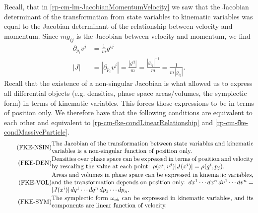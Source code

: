 Recall, that in \ref{rp-cm-lm-JacobianMomentumVelocity} we saw that the Jacobian determinant of the transformation from state variables to kinematic variables was equal to the Jacobian determinant of the relationship between velocity and momentum. Since $m g_{ij}$ is the Jacobian between velocity and momentum, we find
\begin{equation}\label{rp-cm-fke-metricTensorDeterminantIsJacobianForDensities}
	\begin{aligned}
		\partial_{p_i} v^j &= \frac{1}{m}g^{ij} \\
		|J| &= |\partial_{p_i} v^j | = \frac{|g^{ij}|}{m} = \frac{|g_{ij}|^{-1}}{m} = \frac{1}{m \,|g_{ij}|}. 
	\end{aligned}
\end{equation}
Recall that the existence of a non-singular Jacobian is what allowed us to express all differential objects (e.g. densities, phase space areas/volumes, the symplectic form) in terms of kinematic variables. This forces those expressions to be in terms of position only. We therefore have that the following conditions are equivalent to each other and equivalent to \ref{rp-cm-fke-condLinearRelationship} and \ref{rp-cm-fke-condMassiveParticle}.
\begin{align}
	\tag{FKE-NSIN}\label{rp-cm-fke-condJacobianOfPosition}
	&\eqtext{The Jacobian of the transformation between state variables and kinematic variables is a non-singular function of position only.} \\
	\tag{FKE-DEN}\label{rp-cm-fke-condDensitiesOfPosition}
	&\eqtext{Densities over phase space can be expressed in terms of position and velocity by rescaling the value at each point: $\rho(x^i, v^j) |J(x^i)| = \rho(q^i, p_j)$.} \\
	\tag{FKE-VOL}\label{rp-cm-fke-condAreasOfPosition}
	&\eqtext{Areas and volumes in phase space can be expressed in kinematic variables, and the transformation depends on position only: $dx^1 \cdots dx^n \, dv^1 \cdots dv^n = |J(x^i)| \, dq^1 \cdots dq^n \, dp_1 \cdots dp_n$.} \\
	\tag{FKE-SYM}\label{rp-cm-fke-condSymplecticOfPosition}
	&\eqtext{The symplectic form $\omega_{ab}$ can be expressed in kinematic variables, and its components are linear function of velocity.}
\end{align}

